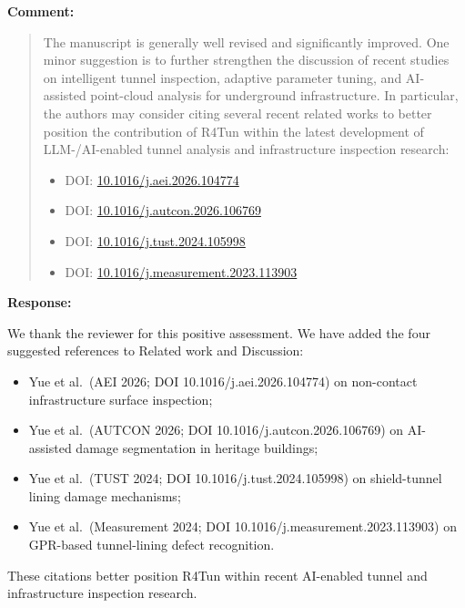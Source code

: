 \documentclass[11pt,a4paper]{article}
\newenvironment{commentblock}{%
  \par\smallskip\noindent\textbf{Comment:}\par
  \begin{quote}\itshape\color{black}
}{%
  \end{quote}\smallskip
}
\newenvironment{responseblock}{%
  \par\smallskip\noindent\textbf{Response:}\par
  \begingroup\color{responsegreen}
}{%
  \endgroup\smallskip
}
\begin{document}
\begin{commentblock}
The manuscript is generally well revised and significantly improved. One minor suggestion is to further strengthen the discussion of recent studies on intelligent tunnel inspection, adaptive parameter tuning, and AI-assisted point-cloud analysis for underground infrastructure. In particular, the authors may consider citing several recent related works to better position the contribution of R4Tun within the latest development of LLM-/AI-enabled tunnel analysis and infrastructure inspection research:
\begin{itemize}[nosep]
  \item DOI: \url{10.1016/j.aei.2026.104774}
  \item DOI: \url{10.1016/j.autcon.2026.106769}
  \item DOI: \url{10.1016/j.tust.2024.105998}
  \item DOI: \url{10.1016/j.measurement.2023.113903}
\end{itemize}
\end{commentblock}
\begin{responseblock}
We thank the reviewer for this positive assessment. We have added the four suggested references to Related work and Discussion:
\begin{itemize}[nosep]
  \item Yue et al.\ (AEI 2026; DOI 10.1016/j.aei.2026.104774) on non-contact infrastructure surface inspection;
  \item Yue et al.\ (AUTCON 2026; DOI 10.1016/j.autcon.2026.106769) on AI-assisted damage segmentation in heritage buildings;
  \item Yue et al.\ (TUST 2024; DOI 10.1016/j.tust.2024.105998) on shield-tunnel lining damage mechanisms;
  \item Yue et al.\ (Measurement 2024; DOI 10.1016/j.measurement.2023.113903) on GPR-based tunnel-lining defect recognition.
\end{itemize}
These citations better position R4Tun within recent AI-enabled tunnel and infrastructure inspection research.
\end{responseblock}
\end{document}

